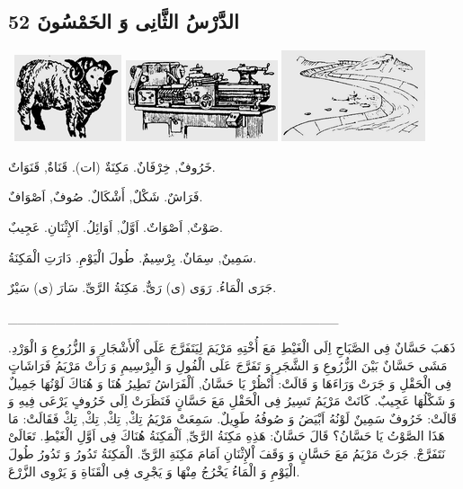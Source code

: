 \documentclass[a5paper]{article}
\begin{document}
\subsection{الدَّرْسُ الثَّانِى وَ الخَمْسُونَ 52}
\  \includegraphics[width=1.2398in,height=1in]{images/MuhammadBagauddinprettified-img171.png}   \includegraphics[width=1.7602in,height=0.9374in]{images/MuhammadBagauddinprettified-img172.png}   \includegraphics[width=1.6665in,height=1.052in]{images/MuhammadBagauddinprettified-img173.png} 

خَرُوفٌ, خِرْفَانٌ. مَكِنَةٌ (ات). قَنَاةٌ, قَنَوَاتٌ. 

فَرَاشٌ. شَكْلٌ, أَشْكَالٌ. صُوفٌ, اَصْوَافٌ. 

صَوْتٌ, اَصْوَاتٌ. اَوَّلٌ, اَوَائِلُ. اَلإِثْنَانِ. عَجِيبٌ. 

سَمِينٌ, سِمَانٌ. بِرْسِيمٌ. طُولَ الْيَوْمِ. دَارَتِ الْمَكِنَةُ. 

جَرَى الْمَاءُ. رَوَى (ى) رَىٌّ. مَكِنَةُ الرَّىِّ. سَارَ (ى) سَيْرٌ.

\_\_\_\_\_\_\_\_\_\_\_\_\_\_\_\_\_\_\_\_\_\_\_\_\_\_\_\_\_\_\_\_\_\_\_

ذَهَبَ حَسَّانٌ فِى الصَّبَاحِ اِلَى الْغَيْطِ مَعَ أُخْتِهِ مَرْيَمَ لِيَتَفَرَّجَ عَلَى اْلأَشْجَارِ وَ الزُّرُوعِ وَ الْوَرْدِ. مَشَى حَسَّانٌ بَيْنَ الزُّرُوعِ وَ الشَّجَرِ وَ تَفَرَّجَ عَلَى الْفُولِ وَ الْبِرْسِيمِ وَ رَأَتْ مَرْيَمُ فَرَاشَاتٍ فِى الْحَقْلِ وَ جَرَتْ وَرَاءَهَا وَ قَالَتْ: أُنْظُرْ يَا حَسَّانُ, اَلْفَرَاشُ تَطِيرُ هُنَا وَ هُنَاكَ لَوْنُهَا جَمِيلٌ وَ شَكْلُهَا عَجِيبٌ. كَانَتْ مَرْيَمُ تَسِيرُ فِى الْحَقْلِ مَعَ حَسَّانٍ فَنَظَرَتْ اِلَى خَرُوفٍ يَرْعَى فِيهِ وَ قَالَتْ: خَرُوفٌ سَمِينٌ لَوْنُهُ اَبْيَضُ وَ صُوفُهُ طَوِيلٌ. سَمِعَتْ مَرْيَمُ تِكْ, تِكْ, تِكْ, تِكْ فَقَالَتْ: مَا هَذَا الصَّوْتُ يَا حَسَّانُ؟ قَالَ حَسَّانٌ: هَذِهِ مَكِنَةُ الرَّىِّ, اَلْمَكِنَةُ هُنَاكَ فِى اَوَّلِ الْغَيْطِ. تَعَالَىْ نَتَفَرَّجْ. جَرَتْ مَرْيَمُ مَعَ حَسَّانٍ وَ وَقَفَ اْلإِثْنَانِ اَمَامَ مَكِنَةِ الرَّىِّ. الْمَكِنَةُ تَدُورُ وَ تَدُورُ طُولَ الْيَوْمِ وَ الْمَاءُ يَخْرُجُ مِنْهَا وَ يَجْرِى فِى الْقَنَاةِ وَ يَرْوِى الزَّرْعَ. 
\end{document}
